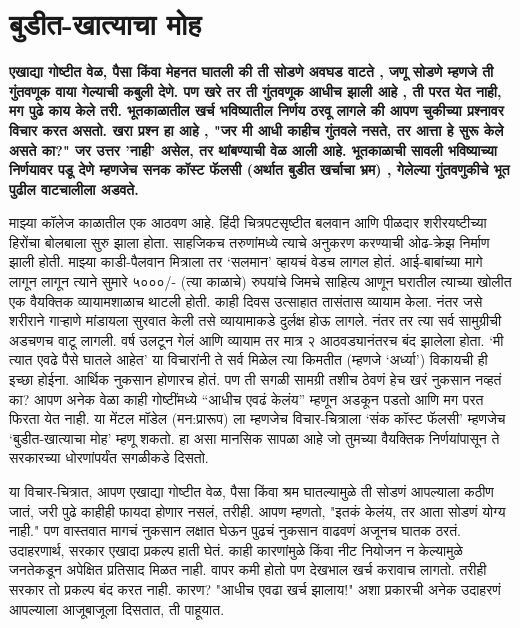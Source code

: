 \chapter{बुडीत-खात्याचा मोह}

\textcolor{blue!60!black}{\textbf{एखाद्या गोष्टीत वेळ, पैसा किंवा मेहनत घातली की ती सोडणे अवघड वाटते , जणू सोडणे म्हणजे ती गुंतवणूक वाया गेल्याची कबुली देणे. पण खरे तर ती गुंतवणूक आधीच झाली आहे , ती परत येत नाही, मग पुढे काय केले तरी. भूतकाळातील खर्च भविष्यातील निर्णय ठरवू लागले की आपण चुकीच्या प्रश्नावर विचार करत असतो. खरा प्रश्न हा आहे , "जर मी आधी काहीच गुंतवले नसते, तर आत्ता हे सुरू केले असते का?" जर उत्तर 'नाही' असेल, तर थांबण्याची वेळ आली आहे. भूतकाळाची सावली भविष्याच्या निर्णयावर पडू देणे म्हणजेच सनक कॉस्ट फॅलसी (अर्थात बुडीत खर्चाचा भ्रम) , गेलेल्या गुंतवणुकीचे भूत पुढील वाटचालीला अडवते.}}

माझ्या कॉलेज काळातील एक आठवण आहे. हिंदी चित्रपटसृष्टीत बलवान आणि पीळदार शरीरयष्टीच्या हिरोंचा बोलबाला सुरु झाला होता. साहजिकच तरुणांमध्ये त्याचे अनुकरण करण्याची ओढ-क्रेझ निर्माण झाली होती. माझ्या काडी-पैलवान मित्राला तर ‘सलमान’ व्हायचं वेडच लागल होतं. आई-बाबांच्या मागे लागून लागून त्याने सुमारे ५०००/- (त्या काळाचे) रुपयांचे जिमचे साहित्य आणून घरातील त्याच्या खोलीत एक वैयक्तिक व्यायामशाळाच थाटली होती. काही दिवस उत्साहात तासंतास व्यायाम केला. नंतर जसे शरीराने गाऱ्हाणे  मांडायला सुरवात केली तसे व्यायामाकडे दुर्लक्ष होऊ लागले. नंतर तर त्या सर्व सामुग्रीची अडचणच वाटू लागली. वर्ष उलटून गेलं आणि व्यायाम तर मात्र २ आठवड्यानंतरच बंद झालेला होता. ‘मी त्यात एवढे पैसे घातले आहेत’ या विचारांनी ते सर्व मिळेल त्या किमतीत (म्हणजे ‘अर्ध्या’) विकायची ही इच्छा होईना. आर्थिक नुकसान होणारच होतं. पण ती सगळी सामग्री तशीच ठेवणं हेच खरं नुकसान नव्हतं का? आपण अनेक वेळा काही गोष्टींमध्ये “आधीच एवढं केलंय” म्हणून अडकून पडतो आणि मग परत फिरता येत नाही. या मेंटल मॉडेल (मन:प्रारूप) ला म्हणजेच विचार-चित्राला ‘संक कॉस्ट फॅलसी’ म्हणजेच ‘बुडीत-खात्याचा मोह’ म्हणू शकतो. हा असा मानसिक सापळा आहे जो तुमच्या वैयक्तिक निर्णयांपासून ते सरकारच्या धोरणांपर्यंत सगळीकडे दिसतो.

या विचार-चित्रात, आपण एखाद्या गोष्टीत वेळ, पैसा किंवा श्रम घातल्यामुळे ती सोडणं आपल्याला कठीण जातं, जरी पुढे काहीही फायदा होणार नसलं, तरीही. आपण म्हणतो, "इतकं केलंय, तर आता सोडणं योग्य नाही." पण वास्तवात मागचं नुकसान लक्षात घेऊन पुढचं नुकसान वाढवणं अजूनच घातक ठरतं. उदाहरणार्थ, सरकार एखादा प्रकल्प हाती घेतं. काही कारणांमुळे किंवा नीट नियोजन न केल्यामुळे जनतेकडून अपेक्षित प्रतिसाद मिळत नाही. वापर कमी होतो पण देखभाल खर्च करावाच लागतो. तरीही सरकार तो प्रकल्प बंद करत नाही. कारण? "आधीच एवढा खर्च झालाय!" अशा प्रकारची अनेक उदाहरणं आपल्याला आजूबाजूला दिसतात, ती पाहूयात.

